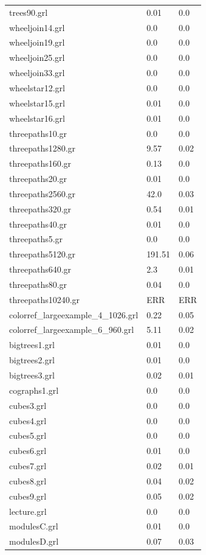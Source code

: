 \documentclass[11pt]{article}
\begin{document}
\begin{table}[h!]
\begin{tabularx}{\textwidth}{|l|X|X|}
		trees90.grl & 0.01 & 0.0 \\
		wheeljoin14.grl & 0.0 & 0.0 \\
		wheeljoin19.grl & 0.0 & 0.0 \\
		wheeljoin25.grl & 0.0 & 0.0 \\
		wheeljoin33.grl & 0.0 & 0.0 \\
		wheelstar12.grl & 0.0 & 0.0 \\
		wheelstar15.grl & 0.01 & 0.0 \\
		wheelstar16.grl & 0.01 & 0.0 \\
		threepaths10.gr & 0.0 & 0.0 \\
		threepaths1280.gr & 9.57 & 0.02 \\
		threepaths160.gr & 0.13 & 0.0 \\
		threepaths20.gr & 0.01 & 0.0 \\
		threepaths2560.gr & 42.0 & 0.03 \\
		threepaths320.gr & 0.54 & 0.01 \\
		threepaths40.gr & 0.01 & 0.0 \\
		threepaths5.gr & 0.0 & 0.0 \\
		threepaths5120.gr & 191.51 & 0.06 \\
		threepaths640.gr & 2.3 & 0.01 \\
		threepaths80.gr & 0.04 & 0.0 \\
		threepaths10240.gr & ERR & ERR \\
		colorref\_largeexample\_4\_1026.grl & 0.22 & 0.05 \\
		colorref\_largeexample\_6\_960.grl & 5.11 & 0.02 \\
		bigtrees1.grl & 0.01 & 0.0 \\
		bigtrees2.grl & 0.01 & 0.0 \\
		bigtrees3.grl & 0.02 & 0.01 \\
		cographs1.grl & 0.0 & 0.0 \\
		cubes3.grl & 0.0 & 0.0 \\
		cubes4.grl & 0.0 & 0.0 \\
		cubes5.grl & 0.0 & 0.0 \\
		cubes6.grl & 0.01 & 0.0 \\
		cubes7.grl & 0.02 & 0.01 \\
		cubes8.grl & 0.04 & 0.02 \\
		cubes9.grl & 0.05 & 0.02 \\
		lecture.grl & 0.0 & 0.0 \\
		modulesC.grl & 0.01 & 0.0 \\
		modulesD.grl & 0.07 & 0.03 \\

\end{tabularx}
\end{table}
\end{document}
